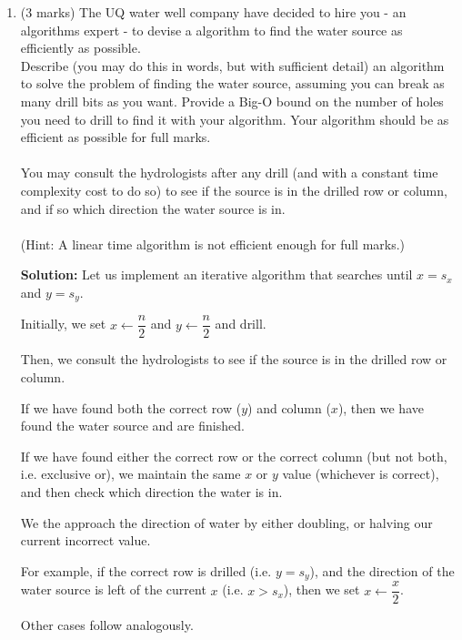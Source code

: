 \documentclass[a4,13pt]{extarticle}
\newenvironment{Solution}{\color{blue}\textbf{Solution:}}{}
\begin{document}
\begin{enumerate}
	      \begin{enumerate} 
	      	\item (3 marks) The UQ water well company have decided to hire you - an algorithms expert - to devise a algorithm 
	      	      to find the water source as efficiently as possible. \\
	      	      	      	              
	      	      Describe (you may do this in words, but with sufficient detail) an algorithm to solve the problem of finding the water source, 
	      	      assuming you can break as many drill bits as you want. Provide a Big-O bound on the number of holes you need to drill to find 
	      	      it with your algorithm. Your algorithm should be as efficient as possible for full marks.\\\\
	      	      You may consult the hydrologists after any drill (and with a constant time complexity cost to do so) to see if 
	      	      the source is in the drilled row or column, and if so which direction the water source is in.\\\\
	      	      (Hint: A linear time algorithm is not efficient enough for full marks.)
	      	      
	      	\begin{Solution}
Let us implement an iterative algorithm that searches until $x=s_x$ and $y=s_y$.

Initially, we set $x\gets\dfrac{n}2$ and $y\gets\dfrac{n}2$ and drill.

Then, we consult the hydrologists to see if the source is in the drilled row or column.

If we have found both the correct row ($y$) and column ($x$), then we have found the water source and are finished.

If we have found either the correct row or the correct column (but not both, i.e. exclusive or), we maintain the same $x$ or $y$ value (whichever is correct), and then check which direction the water is in.

We the approach the direction of water by either doubling, or halving our current incorrect value.

For example, if the correct row is drilled (i.e. $y=s_y$), and the direction of the water source is left of the current $x$ (i.e. $x>s_x$), then we set $x\gets\dfrac{x}2$.

Other cases follow analogously.


\end{Solution}
\end{enumerate}
\end{enumerate}
\end{document}

